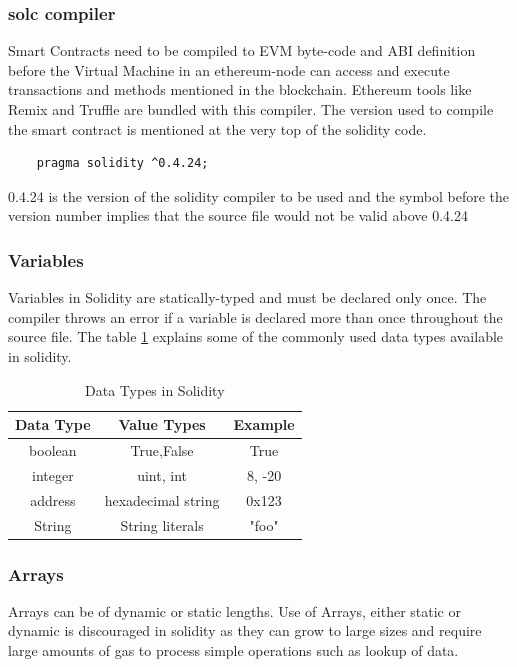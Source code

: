 \documentclass[11pt,openright]{report}
\begin{document}
\subsubsection{solc compiler}
Smart Contracts need to be compiled to EVM byte-code and ABI definition before the Virtual Machine in an ethereum-node can access and execute transactions and methods mentioned in the blockchain. Ethereum tools like Remix and Truffle are bundled with this compiler. The version used to compile the smart contract is mentioned at the very top of the solidity code.

\begin{verbatim}
    pragma solidity ^0.4.24;
\end{verbatim}

0.4.24 is the version of the solidity compiler to be used and the symbol before the version number implies that the source file would not be valid above 0.4.24

\subsubsection{Variables}
Variables in Solidity are statically-typed and must be declared only once. The compiler throws an error if a variable is declared more than once throughout the source file. The table \ref{solidity_data_types} explains some of the commonly used data types available in solidity.
 
\begin{table}[!htbp]
	\renewcommand{\arraystretch}{1.3}
	\caption{Data Types in Solidity}
	\label{solidity_data_types}
	\centering
	\begin{tabular}{|c|c|c|}
		\hline
		\bfseries Data Type & \bfseries Value Types & \bfseries Example \\
		\hline\hline
		boolean & True,False & True \\ \hline
		integer & uint, int & 8, -20 \\ \hline
		address & hexadecimal string & 0x123 \\ \hline
		String & String literals & "foo" \\ \hline
	\end{tabular}
\end{table}

\subsubsection{Arrays}
Arrays can be of dynamic or static lengths. Use of Arrays, either static or dynamic is discouraged in solidity as they can grow to large sizes and require large amounts of gas to process simple operations such as lookup of data.
\end{document}
